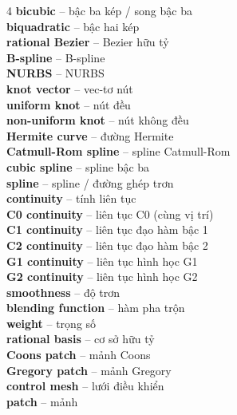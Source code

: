 \begin{multicols}{4}
\textbf{bicubic} -- bậc ba kép / song bậc ba\\
\textbf{biquadratic} -- bậc hai kép\\
\textbf{rational Bezier} -- Bezier hữu tỷ\\
\textbf{B-spline} -- B-spline\\
\textbf{NURBS} -- NURBS\\
\textbf{knot vector} -- vec-tơ nút\\
\textbf{uniform knot} -- nút đều\\
\textbf{non-uniform knot} -- nút không đều\\
\textbf{Hermite curve} -- đường Hermite\\
\textbf{Catmull-Rom spline} -- spline Catmull-Rom\\
\textbf{cubic spline} -- spline bậc ba\\
\textbf{spline} -- spline / đường ghép trơn\\
\textbf{continuity} -- tính liên tục\\
\textbf{C0 continuity} -- liên tục C0 (cùng vị trí)\\
\textbf{C1 continuity} -- liên tục đạo hàm bậc 1\\
\textbf{C2 continuity} -- liên tục đạo hàm bậc 2\\
\textbf{G1 continuity} -- liên tục hình học G1\\
\textbf{G2 continuity} -- liên tục hình học G2\\
\textbf{smoothness} -- độ trơn\\
\textbf{blending function} -- hàm pha trộn\\
\textbf{weight} -- trọng số\\
\textbf{rational basis} -- cơ sở hữu tỷ\\
\textbf{Coons patch} -- mảnh Coons\\
\textbf{Gregory patch} -- mảnh Gregory\\
\textbf{control mesh} -- lưới điều khiển\\
\textbf{patch} -- mảnh\\


\end{multicols}
